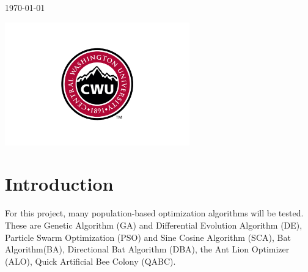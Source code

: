 \documentclass[12pt]{article}
\begin{document}
\begin{titlepage}
        
        \vfill
        
        {\large \today}\\ %
        
        \vfill
        
        \includegraphics[width=8cm]{CWU-Logo.png}\\[.5cm] %
        
        
        \vfill %
        
    \end{titlepage}
    \newpage
    \tableofcontents
    \newpage
    
    
    


\section{Introduction}

For this project, many population-based optimization algorithms will be tested. These are Genetic Algorithm (GA) and Differential Evolution Algorithm (DE), Particle Swarm Optimization (PSO) and Sine Cosine Algorithm (SCA), Bat Algorithm(BA), Directional Bat Algorithm (DBA), the Ant Lion Optimizer (ALO), Quick Artificial Bee Colony (QABC).
\end{document}
